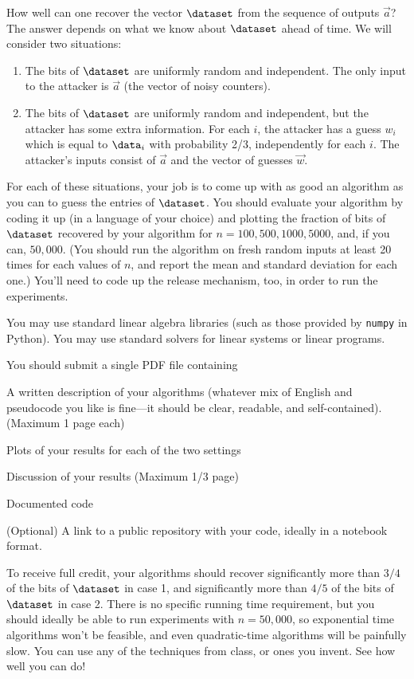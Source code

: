 \documentclass[11pt]{article}
\begin{document}
\begin{enumerate}[leftmargin=\parindent, itemsep=3ex]
  How well can one recover the vector $\dataset$ from the sequence of
  outputs $\vec a $?  The answer depends on what we know about
  $\dataset$ ahead of time.
%
  We will consider two situations:

  \begin{enumerate}
  \item The bits of $\dataset$ are uniformly random and
    independent. The only input to the attacker is $\vec a$ (the vector of noisy counters). 
  \item The bits of $\dataset$ are uniformly random and independent, but
    the attacker has some extra information. For each $i$, the
    attacker has a guess $w_i$ which is equal to $\data_i$ with
    probability 2/3, independently for each $i$. The attacker's inputs
    consist of $\vec a$ and the vector of guesses $\vec w$. 
  \end{enumerate}

  For each of these situations, your job is to come up with as good an
  algorithm as you can to guess the entries of $\dataset$. You should
  evaluate your algorithm by coding it up (in a language of your
  choice) and plotting the fraction of bits of $\dataset$ recovered by
  your algorithm for $n= 100, 500, 1000, 5000$, and, if you can, $50,000$. (You
  should run the algorithm on fresh random inputs at least 20 times
  for each values of $n$, and report the mean and standard deviation
  for each one.) You'll need to code up the release mechanism, too, in
  order to run the experiments.

  You may use standard linear algebra libraries (such as those
  provided by \texttt{numpy} in Python). You may use standard solvers
  for linear systems or linear programs. 

 
  You should submit a single PDF file containing
  \begin{compactitem}
  \item A written description of your algorithms (whatever mix of
    English and pseudocode you like is fine---it should be clear,
    readable, and self-contained). (Maximum 1 page each)
  \item Plots of your results for each of the two settings
    \item Discussion of your results (Maximum 1/3
      page)
  \item Documented code
  \item (Optional) A link to a public repository with your code,
    ideally in a notebook format.
  \end{compactitem}

  To receive full credit, your algorithms should recover significantly
  more than $3/4$ of the bits of $\dataset$ in case 1, and
  significantly more than $4/5$ of the bits of $\dataset$ in case
  2. There is no specific running time requirement, but you should ideally be
  able to run experiments with $n=50,000$, so exponential time
  algorithms won't be feasible, and even quadratic-time algorithms
  will be painfully slow. You can use any of the techniques
  from class, or ones you invent. See how well you can do!




\end{enumerate}
\end{document}
